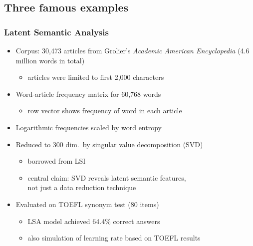 \documentclass[t]{beamer} %
\begin{document}
\subsection{Three famous examples}

\begin{frame}
  \frametitle{Latent Semantic Analysis \citep{Landauer:Dumais:97}}

  \begin{itemize}
  \item Corpus: 30,473 articles from Grolier's \emph{Academic American Encyclopedia} (4.6 million words in total)
    \begin{itemize}
    \item[\hand] articles were limited to first 2,000 characters
    \end{itemize}
  \item Word-article frequency matrix for 60,768 words
    \begin{itemize}
    \item row vector shows frequency of word in each article
    \end{itemize}
  \item Logarithmic frequencies scaled by word entropy
  \item Reduced to 300 dim.\ by singular value decomposition (SVD)
    \begin{itemize}
    \item borrowed from LSI \citep{Dumais:etc:88}
    \item[\hand] central claim: SVD reveals latent semantic features,\\
      not just a data reduction technique
    \end{itemize}
  \item Evaluated on TOEFL synonym test (80 items)
    \begin{itemize}
    \item LSA model achieved 64.4\% correct answers
    \item also simulation of learning rate based on TOEFL results
    \end{itemize}
  \end{itemize}
\end{frame}
\end{document}
